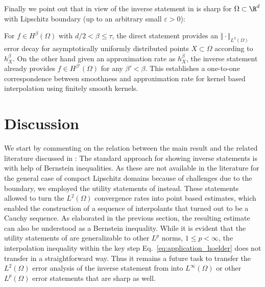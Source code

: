 \documentclass[a4paper, 10pt]{article}
\begin{document}
%




%
%
%
%

Finally we point out that in view of  the inverse statement in  is sharp for $\Omega \subset \R^d$ with Lipschitz boundary (up to an arbitrary small $\varepsilon > 0$):

For $f \in H^\beta(\Omega)$ with $d/2 < \beta \leq \tau$, 
the direct statement  provides an $\Vert \cdot \Vert_{L^2(\Omega)}$ error decay for asymptotically uniformly distributed points $X \subset \Omega$ according to $h_{X}^\beta$.
On the other hand given an approximation rate as $h_X^\beta$, the inverse statement  already provides $f \in H^{\beta'}(\Omega)$ for any $\beta' < \beta$.
%
This establishes a one-to-one correspondence between smoothness and approximation rate for kernel based interpolation using finitely smooth kernels.
%
%





%
%
%
%
%
%
%
%
%
%
%







%
%
%
%
%
%
%
%



%
%
%
%
%
%
%
%
%
%
%
%
%
%
%
%
%
%
%
%
%
%
%
%
%
%
%
%
%
%
%
%
%
%
%
%
%
%
%
%
%
%
%
%
%
%
%
%
%
%
%
%
%
%
%
%
%
%
%
%
%
%
%
%
%
%
%
%
%
%
%
%
%
%
%
%
%
%
%
%
%


%
\section{Discussion} \label{sec:discussion_remarks}

%
%
%
%
%
%
%
%
%
%
%
%
%
%
%
%
%
%
%
%
%

We start by commenting on the relation between the main result  and the related literature discussed in :
The standard approach for showing inverse statements is with help of Bernstein inequalities.
As these are not available in the literature for the general case of compact Lipschitz domains because of challenges due to the boundary,
we employed the utility statements of  instead.
These statements allowed to turn the $L^2(\Omega)$ convergence rates into point based estimates, 
which enabled the construction of a sequence of interpolants that turned out to be a Cauchy sequence.
As elaborated in the previous section, the resulting estimate can also be understood as a Bernstein inequality.
While it is evident that the utility statements of  are generalizable to other $L^p$ norms, $1 \leq p < \infty$,
the interpolation inequality within the key step Eq.~\eqref{eq:application_hoelder} does not transfer in a straightforward way.
Thus it remains a future task to transfer the $L^2(\Omega)$ error analysis of the inverse statement from  into $L^\infty(\Omega)$ or other $L^p(\Omega)$ error statements that are sharp as well. 
\end{document}
